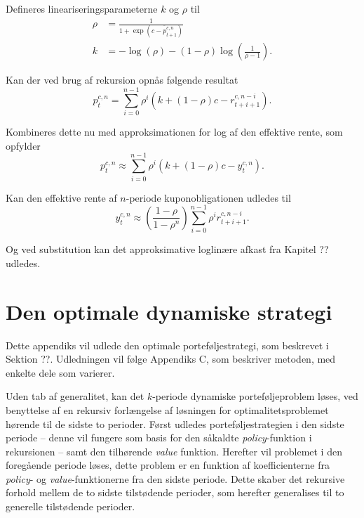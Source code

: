 \documentclass[
  a4paper,
  oneside]{memoir}
\begin{document}
Defineres lineariseringsparameterne \(k\) og \(\rho\) til
\begin{align}
\rho&=\frac{1}{1+\exp\left(\overline{c- p_{t+1}^{c,n}}\right)}\\
k&=-\log\left(\rho\right)-\left(1-\rho\right)\log\left(\frac{1}{\rho-1}\right).
\end{align}

Kan der ved brug af rekursion opnås følgende resultat
\begin{equation}
p_t^{c,n}=\sum_{i=0}^{n-1} \rho^i\left(k+\left(1-\rho\right)c - r_{t+i+1}^{c,n-i}\right).
\end{equation}

Kombineres dette nu med approksimationen for log af den effektive rente, som opfylder
\begin{equation}
p_t^{c,n}\approx\sum_{i=0}^{n-1} \rho^i\left(k+\left(1-\rho\right)c - y_t^{c,n}\right).
\end{equation}

Kan den effektive rente af \(n\)-periode kuponobligationen udledes til
\begin{equation}
y_t^{c,n}\approx \left(\frac{1-\rho}{1-\rho^n}\right)\sum_{i=0}^{n-1}\rho^i r_{t+i+1}^{c,n-i}.
\end{equation}

Og ved substitution kan det approksimative loglinære afkast fra Kapitel ?? udledes.

\hypertarget{optdynstrategi}{%
\chapter{Den optimale dynamiske strategi}\label{optdynstrategi}}

Dette appendiks vil udlede den optimale porteføljestrategi, som beskrevet i Sektion ??. Udledningen vil følge \citep{JurVic2011} Appendiks C, som beskriver metoden, med enkelte dele som varierer.

Uden tab af generalitet, kan det \(k\)-periode dynamiske porteføljeproblem løses, ved benyttelse af en rekursiv forlængelse af løsningen for optimalitetsproblemet hørende til de sidste to perioder. Først udledes porteføljestrategien i den sidste periode -- denne vil fungere som basis for den såkaldte \emph{policy}-funktion i rekursionen -- samt den tilhørende \emph{value} funktion. Herefter vil problemet i den foregående periode løses, dette problem er en funktion af koefficienterne fra \emph{policy}- og \emph{value}-funktionerne fra den sidste periode. Dette skaber det rekursive forhold mellem de to sidste tilstødende perioder, som herefter generalises til to generelle tilstødende perioder.
\end{document}

